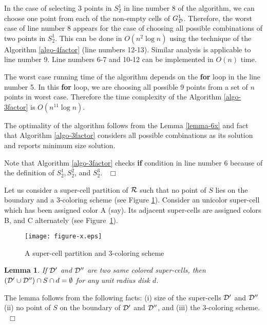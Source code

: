 \documentclass[a4paper,11pt]{article}
\newtheorem{lemma}{Lemma}
\newenvironment{proof}{\noindent {\bf Proof:\,\ }}{\hfill\mbox{\
$\Box$}\smallskip}
\begin{document}
\begin{proof}
 In the case of selecting 3 points in $S_2^1$ in line number 8 of the algorithm, we can choose one point from 
 each of the non-empty cells  of $G_{\cal D}^1$. Therefore, the worst case of line number 8 appears for the 
 case of choosing all possible combinations of two points in $S_2^1$. This can be done in $O(n^2 \log n)$ using 
 the technique of the Algorithm \ref{algo-4factor} (line numbers 12-13). Similar analysis is applicable to line 
 number 9. Line numbers 6-7 and 10-12 can be implemented in $O(n)$ time.
 
 The worst case running time of the algorithm depends on the {\bf for} loop in the line number 5. In this 
 {\bf for} loop, we are choosing all possible 9 points from a set of $n$ points in worst case. Therefore the
 time complexity of the Algorithm \ref{algo-3factor} is $O(n^{11} \log n)$.  
 
 The optimality of the algorithm follows from the Lemma \ref{lemma-6x} and fact that Algorithm \ref{algo-3factor} 
 considers all possible combinations as its solution and reports minimum size solution.
 
 Note that Algorithm \ref{algo-3factor} checks {\bf if} condition in line number 6 because of the definition 
 of $S_2^1, S_2^2$, and $S_2^3$. 
\end{proof}

Let us consider a super-cell partition of ${\cal R}$ such that no point of $S$ lies on the boundary and a 
3-coloring scheme (see Figure \ref{fig:fig15}). Consider an unicolor super-cell which has been assigned 
color A (say). Its adjacent super-cells are assigned colors B, and C alternately (see Figure~\ref{fig:fig15}). 

\begin{figure}[ht]
\begin{center}
\texttt{[image: figure-x.eps]}
\caption{A super-cell partition and 3-coloring scheme}
\label{fig:fig15}
\end{center}
\end{figure}

\begin{lemma} \label{lemma-8x}
 If ${\cal D}'$ and ${\cal D}''$ are two same colored super-cells, then 
 $({\cal D}' \cup {\cal D}'') \cap S \cap d = \emptyset$ for any unit radius disk $d$.
\end{lemma}

\begin{proof}
The lemma follows from the following facts: (i) size of the super-cells ${\cal D}'$ and ${\cal D}''$ 
(ii) no point of $S$ on the boundary of ${\cal D}'$ and ${\cal D}''$, and (iii) the 3-coloring scheme.  
\end{proof}
\end{document}
